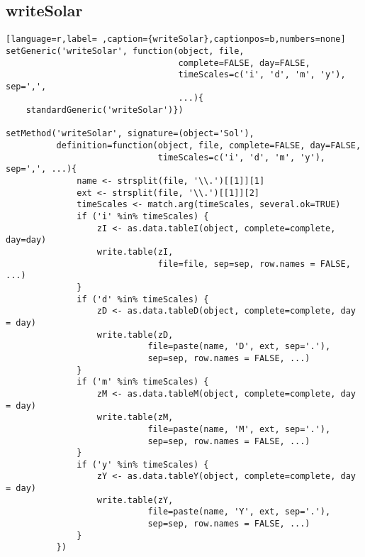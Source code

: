\subsection{writeSolar}
\label{sec:org9012cd9}
\label{subsec:writesolar}
\begin{lstlisting}[language=r,label= ,caption={writeSolar},captionpos=b,numbers=none]
setGeneric('writeSolar', function(object, file,
                                  complete=FALSE, day=FALSE,
                                  timeScales=c('i', 'd', 'm', 'y'), sep=',',
                                  ...){
    standardGeneric('writeSolar')})

setMethod('writeSolar', signature=(object='Sol'),
          definition=function(object, file, complete=FALSE, day=FALSE,
                              timeScales=c('i', 'd', 'm', 'y'), sep=',', ...){
              name <- strsplit(file, '\\.')[[1]][1]
              ext <- strsplit(file, '\\.')[[1]][2]
              timeScales <- match.arg(timeScales, several.ok=TRUE)
              if ('i' %in% timeScales) {
                  zI <- as.data.tableI(object, complete=complete, day=day)
                  write.table(zI,
                              file=file, sep=sep, row.names = FALSE, ...)
              }
              if ('d' %in% timeScales) {
                  zD <- as.data.tableD(object, complete=complete, day = day)
                  write.table(zD,
                            file=paste(name, 'D', ext, sep='.'),
                            sep=sep, row.names = FALSE, ...)
              }
              if ('m' %in% timeScales) {
                  zM <- as.data.tableM(object, complete=complete, day = day)
                  write.table(zM,
                            file=paste(name, 'M', ext, sep='.'),
                            sep=sep, row.names = FALSE, ...)
              }
              if ('y' %in% timeScales) {
                  zY <- as.data.tableY(object, complete=complete, day = day)
                  write.table(zY,
                            file=paste(name, 'Y', ext, sep='.'),
                            sep=sep, row.names = FALSE, ...)
              }
          })
\end{lstlisting}
